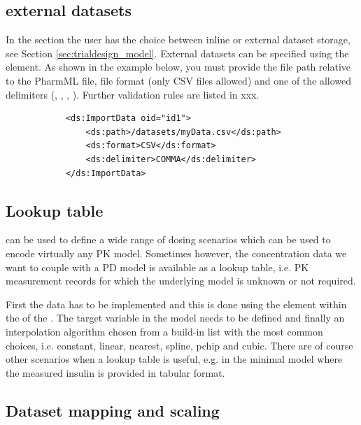 \subsection{ external datasets}
\label{subsec:TrialDesignExternal}

In the  section the user has the choice between inline or
external dataset storage, see Section \ref{sec:trialdesign_model}.
External datasets can be specified using the  element. 
As shown in the example below, you must provide the file path relative to the PharmML file, 
file format (only CSV files allowed) and one of the allowed delimiters (, 
, , ). Further validation rules are listed in xxx.

\lstset{language=XML}
\begin{lstlisting}
            <ds:ImportData oid="id1">
                <ds:path>/datasets/myData.csv</ds:path>
                <ds:format>CSV</ds:format>
                <ds:delimiter>COMMA</ds:delimiter>
            </ds:ImportData>
\end{lstlisting}



\subsection{Lookup table}
\label{subsec:lookupTable}

 can be used to define a wide range of dosing scenarios 
which can be used to encode virtually any PK model. Sometimes however, 
the concentration data we want to couple with a PD model is available as a 
lookup table, i.e. PK measurement records for which the underlying model 
is unknown or not required.

First the data has to be implemented and this is done using the 
element within the  of the . The target variable 
in the model needs to be defined and finally an interpolation algorithm chosen 
from a build-in list with the most common choices, i.e. constant, linear, nearest, 
spline, pchip and cubic. There are of course other scenarios when a lookup table is 
useful, e.g. in the minimal model where the measured insulin is provided in tabular
format.


\subsection{Dataset mapping and scaling}
\label{subsec:lookupTable}


